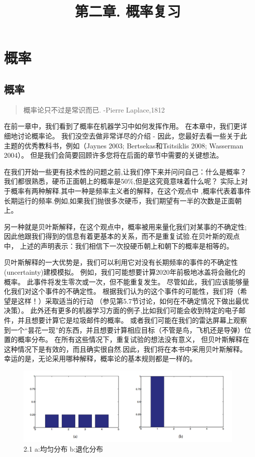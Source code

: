 \documentclass{article}
\title{ 第二章. 概率复习}
\begin{document}
 \date{}
 \maketitle
 \setcounter{section}{1}
  \section{概率}
   \subsection{概率}
   \begin{quote}
    概率论只不过是常识而已. -Pierre Laplace,1812
   \end{quote}
   在前一章中，我们看到了概率在机器学习中如何发挥作用。 
   在本章中，我们更详细地讨论概率论。 我们没空去做非常详尽的介绍 - 
   因此，您最好去看一些关于此主题的优秀教科书，例如（Jaynes 2003; Bertsekas和Tsitsiklis 2008; Wasserman 2004）。
   但是我们会简要回顾许多您将在后面的章节中需要的关键想法。
   \par
   在我们开始一些更有技术性的问题之前,让我们停下来并问问自己：什么是概率？
   我们都很熟悉，硬币正面朝上的概率是50\%,但是这究竟意味着什么呢？
   实际上对于概率有两种解释.其中一种是频率主义者的解释，在这个观点中
   ,概率代表着事件长期运行的频率.例如,如果我们抛很多次硬币，我们期望有一半的次数是正面朝上。
   \par
   另一种就是贝叶斯解释，在这个观点中，概率被用来量化我们对某事的不确定性;
   因此他跟我们得到的信息有着更基本的关系，而不是重复试验.在贝叶斯的观点中，
   上述的声明表示：我们相信下一次投硬币朝上和朝下的概率是相等的。
   \par
   贝叶斯解释的一大优势是，我们可以利用它对没有长期频率的事件的不确定性(uncertainty)建模模拟。
   例如，我们可能想要计算2020年前极地冰盖将会融化的概率。
   此事件将发生零次或一次，但不能重复发生。 
   尽管如此，我们应该能够量化我们对这个事件的不确定性。 
   根据我们认为的这个事件的可能性，我们将（希望是这样！）采取适当的行动
   （参见第5.7节讨论，如何在不确定情况下做出最优决策）。
   此外还有更多的机器学习方面的例子,比如我们可能会收到特定的电子邮件，并且想要计算它是垃圾邮件的概率。 或者我们可能在我们的雷达屏幕上观察到一个“昙花一现”的东西，并且想要计算相应目标（不管是鸟，飞机还是导弹）位置的概率分布。 在所有这些情况下，重复试验的想法没有意义，
   但贝叶斯解释在这种情况下是有效的，而且确实很自然.因此，我们将在本书中采用贝叶斯解释。 幸运的是，无论采用哪种解释，概率论的基本规则都是一样的。
   \begin{figure}
    \centering
    \includegraphics[width=.8\textwidth]{./Picture/21.png} %
    \caption*{2.1 a:均匀分布 b:退化分布} %
    \label{img1} %
  \end{figure}
\end{document}
